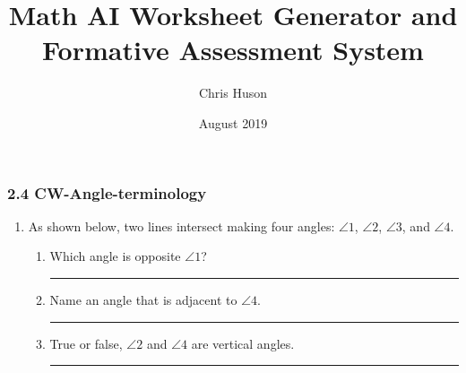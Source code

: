 \documentclass[12pt, twoside]{article}
\title{Math AI Worksheet Generator and Formative Assessment System}
\author{Chris Huson}
\date{August 2019}
\begin{document}
\subsubsection*{2.4 CW-Angle-terminology}
\begin{enumerate}
\item As shown below, two lines intersect making four angles: $\angle 1$, $\angle 2$, $\angle 3$, and $\angle 4$.
    \begin{center}
    \end{center}
    \begin{enumerate}
    \item Which angle is opposite $\angle 1$? \rule{4cm}{0.15mm} \bigskip
    \item Name an angle that is adjacent to $\angle 4$. \rule{4cm}{0.15mm} \bigskip
    \item True or false, $\angle 2$ and $\angle 4$ are vertical angles. \rule{3cm}{0.15mm}
  \end{enumerate}
  \newpage


\end{enumerate}
\end{document}
